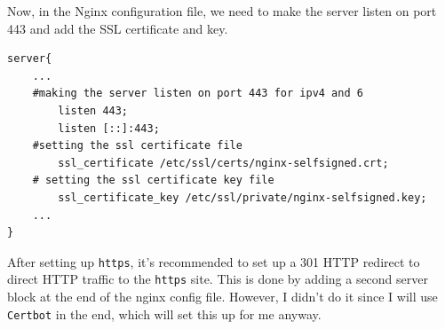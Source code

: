 \documentclass[a4paper]{article}
\begin{document}
Now, in the Nginx configuration file, we need to make the server listen on port 443 and add the SSL certificate and key.
\begin{lstlisting}
server{
	...
	#making the server listen on port 443 for ipv4 and 6
        listen 443;
        listen [::]:443;
	#setting the ssl certificate file
        ssl_certificate /etc/ssl/certs/nginx-selfsigned.crt;
	# setting the ssl certificate key file
        ssl_certificate_key /etc/ssl/private/nginx-selfsigned.key;
	...
}
\end{lstlisting}\newpage
After setting up \texttt{https}, it's recommended to set up a 301 HTTP redirect to direct HTTP traffic to the \texttt{https} site. This is done by adding a second server block at the end of the nginx config file. However, I didn't do it since I will use \texttt{Certbot} in the end, which will set this up for me anyway.
\end{document}
